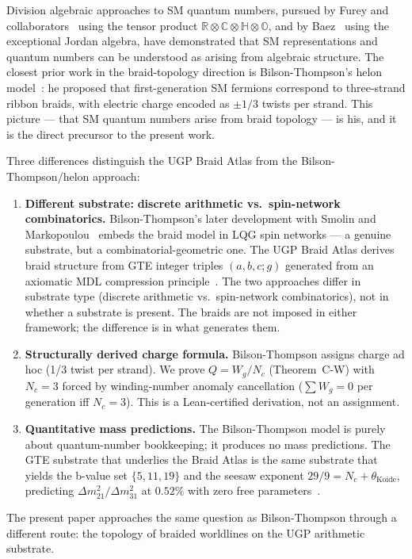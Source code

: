 \documentclass[11pt]{article}
\theoremstyle{remark}
\begin{document}
\begin{sloppypar}
Division algebraic approaches to SM quantum numbers, pursued by Furey and collaborators~\cite{Furey2022,Furey2018} using the tensor product $\mathbb{R} \otimes \mathbb{C} \otimes \mathbb{H} \otimes \mathbb{O}$, and by Baez~\cite{Baez2021SM} using the exceptional Jordan algebra, have demonstrated that SM representations and quantum numbers can be understood as arising from algebraic structure. The closest prior work in the braid-topology direction is Bilson-Thompson's helon model~\cite{bilson-thompson2006,BilsonThompsonMarkopoulouSmolin2007,Bilson-Thompson_2012}: he proposed that first-generation SM fermions correspond to three-strand ribbon braids, with electric charge encoded as $\pm 1/3$ twists per strand. This picture --- that SM quantum numbers arise from braid topology --- is his, and it is the direct precursor to the present work.
\end{sloppypar}
Three differences distinguish the UGP Braid Atlas from the Bilson-Thompson/helon approach:
{\emergencystretch=80pt
\begin{enumerate}[nosep,leftmargin=1.5em]
  \item \textbf{Different substrate:}
    \textbf{discrete arithmetic vs.\ spin-network combinatorics.}
    Bilson-Thompson's later development with Smolin and
    Markopoulou~\mbox{\cite{BilsonThompsonMarkopoulouSmolin2007}}
    embeds the braid model in LQG spin networks --- a genuine substrate, but a combinatorial-geometric one. The UGP Braid Atlas derives braid structure from GTE integer triples $(a,b,c;g)$ generated from an axiomatic MDL compression principle~\cite{spivack2025ugp_uniqueness}. The two approaches differ in substrate type (discrete arithmetic vs.\ spin-network combinatorics), not in whether a substrate is present. The braids are not imposed in either framework; the difference is in what generates them.
  \item \textbf{Structurally derived charge formula.} Bilson-Thompson assigns charge ad hoc (1/3 twist per strand). We prove $Q = W_g/N_c$ (Theorem~C-W) with $N_c = 3$ forced by winding-number anomaly cancellation ($\sum W_g = 0$ per generation iff $N_c = 3$). This is a Lean-certified derivation, not an assignment.
  \item \textbf{Quantitative mass predictions.} The Bilson-Thompson model is purely about quantum-number bookkeeping; it produces no mass predictions. The GTE substrate that underlies the Braid Atlas is the same substrate that yields the b-value set $\{5,11,19\}$ and the seesaw exponent $29/9 = N_c + \theta_\mathrm{Koide}$, predicting $\Delta m^2_{21}/\Delta m^2_{31}$ at $0.52\%$ with zero free parameters~\cite{SpivackNeutrino}.
\end{enumerate}}
The present paper approaches the same question as Bilson-Thompson through a different route: the topology of braided worldlines on the UGP arithmetic substrate.
\end{document}
